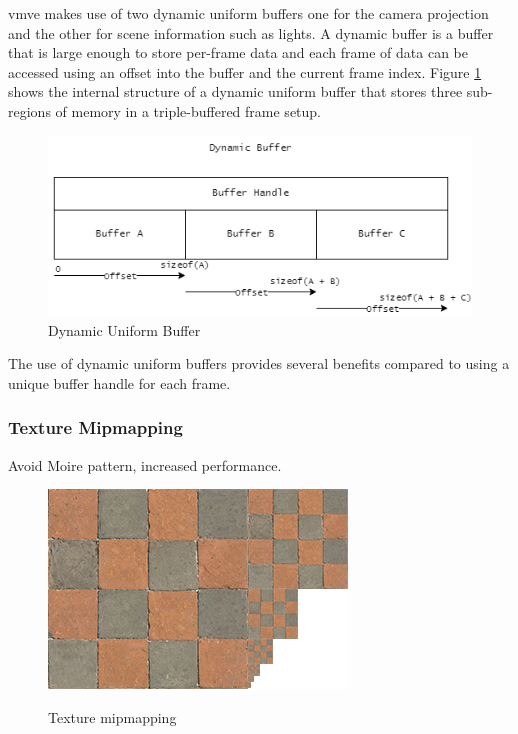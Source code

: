 \documentclass[11pt]{article}
\begin{document}
\gls*{vmve} makes use of two dynamic uniform buffers one for the camera
projection and the other for scene information such as lights. A dynamic buffer
is a buffer that is large enough to store per-frame data and each frame of data
can be accessed using an offset into the buffer and the current frame index.
Figure \ref{fig:dynamic_uniform_buffer} shows the internal structure of a dynamic
uniform buffer that stores three sub-regions of memory in a triple-buffered
frame setup.

\begin{figure}[H]
  \centering
  \includegraphics[width=\textwidth]{images/dynamic_buffer.png}
  \caption{Dynamic Uniform Buffer}
  \label{fig:dynamic_uniform_buffer}
\end{figure}

The use of dynamic uniform buffers provides several benefits compared to using a
unique buffer handle for each frame.

\subsubsection{Texture Mipmapping}
Avoid Moire pattern, increased performance.

\begin{figure}[H]
  \centering
  \includegraphics[width=\textwidth]{images/mipmaps.png}
  \caption{Texture mipmapping}
  \label{fig:texture_mipmapping} \cite{texture_mipmaps}
\end{figure}
\end{document}
